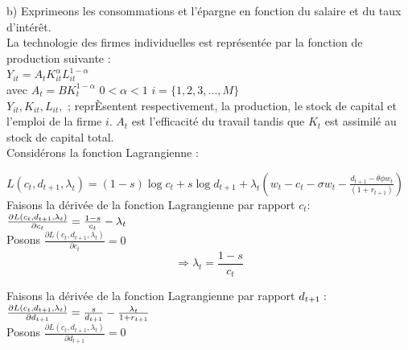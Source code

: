 \documentclass[11pt,twoside,a4paper]{article}
\begin{document}
 
 b) Exprimeons les consommations et l'épargne en fonction du salaire et du taux
d'intér\^{e}t.\\
La technologie des firmes individuelles est représentée par la fonction de production suivante :\\
$Y_{it}=A_tK^{\alpha}_{it}L^{1-\alpha}_{it}$\\

avec \: $A_t=BK^{1-\alpha}_t$ \: $0<\alpha<1$ \: $ i=\{ 1,2,3,...,M \}$\\

$Y_{it}, K_{it},L_{it},$ ; reprÈsentent respectivement, la production, le stock de capital et l'emploi de la firme $i$. $A_t$ est l'efficacité du travail tandis que $K_t$ est assimilé au stock de capital total.\\



Considérons la fonction Lagrangienne :

$ L(c_t,d_{t+1},\lambda_t)= (1-s)\log{c_t} + s\log{d_{t+1}} +\lambda_t(w_t-c_t - \sigma w_t-\frac{d_{t+1}-\overline{\theta}\phi w_t}{(1+r_{t+1})})  $  \\

Faisons la dérivée de la fonction Lagrangienne par rapport $c_t :  $ \\

$\\
\frac{\partial L(c_t,d_{t+1},\lambda_t)}{\partial c_t} = \frac{1-s}{c_t} - \lambda_t 
$ \\
Posons  $ \frac{\partial L(c_t,d_{t+1},\lambda_t)}{\partial c_t} = 0  $ \\



\begin{equation}\label{eq:test4}
  \Rightarrow \lambda_t=\frac{1-s}{c_t}
\end{equation} 


Faisons la dérivée de la fonction Lagrangienne par rapport $d_{t+1} : \\ $
$\\
\frac{\partial L(c_t,d_{t+1},\lambda_t)}{\partial d_{t+1}} = \frac{s}{ d_{t+1}} - \frac{\lambda_t}{1+r_{t+1}} 
$\\

Posons  $ \frac{\partial L(c_t,d_{t+1},\lambda_t)}{\partial d_{t+1}} = 0 $ \\
\end{document}
